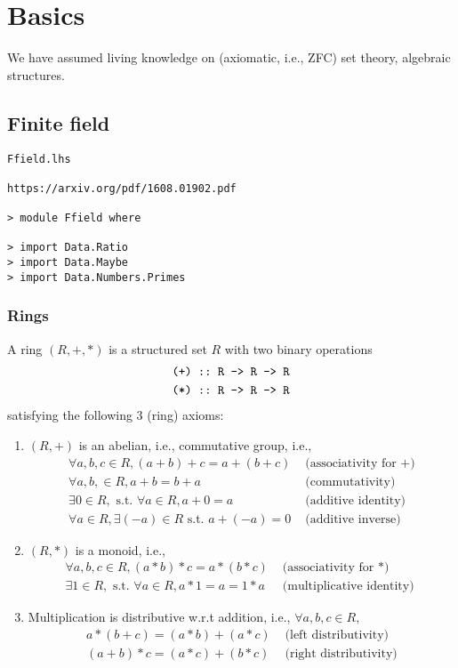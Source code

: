 \documentclass[11pt]{book}
\begin{document}
\chapter{Basics}
We have assumed living knowledge on (axiomatic, i.e., ZFC) set theory, algebraic structures.

\section{Finite field}
\begin{verbatim}
Ffield.lhs

https://arxiv.org/pdf/1608.01902.pdf

> module Ffield where

> import Data.Ratio 
> import Data.Maybe
> import Data.Numbers.Primes
\end{verbatim}

\subsection{Rings}
A ring $(R,+,*)$ is a structured set $R$ with two binary operations
\begin{eqnarray}
\verb|(+) :: R -> R -> R|\\
\verb|(*) :: R -> R -> R|
\end{eqnarray}
satisfying the following 3 (ring) axioms:
\begin{enumerate}
\item $(R,+)$ is an abelian, i.e., commutative group,
i.e.,
\begin{eqnarray}
\forall a,b,c \in R, (a+b) + c = a + (b + c) & \text{ (associativity for $+$)} \\
\forall a, b, \in R, a+b = b+a & \text{ (commutativity)} \\
\exists 0 \in R, \text{ s.t. } \forall a \in R, a + 0 = a & \text{ (additive identity) } \\
\forall a \in R, \exists (-a) \in R \text{ s.t. } a + (-a) = 0 & \text{ (additive inverse)}
\end{eqnarray}

\item $(R,*)$ is a monoid, i.e.,
\begin{eqnarray}
\forall a,b,c \in R, (a*b) * c = a * (b * c) & \text{ (associativity for $*$)} \\
\exists 1 \in R, \text{ s.t. } \forall a \in R, a * 1 = a = 1*a & \text{ (multiplicative identity) } 
\end{eqnarray}

\item Multiplication is distributive w.r.t addition, i.e., $\forall a,b,c \in R$, 
\begin{eqnarray}
a*(b+c) = (a*b) + (a*c) & \text{ (left distributivity)} \\
(a+b)*c = (a*c) + (b*c) & \text{ (right distributivity)} 
\end{eqnarray}

\end{enumerate}
\end{document}
